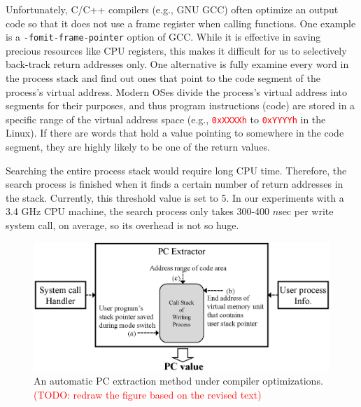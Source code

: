 Unfortunately, C/C++ compilers (e.g., GNU GCC) often optimize an output code so
that it does not use a frame register when calling functions.  One example is a
{\tt -fomit-frame-pointer} option of GCC. While it is effective in saving
precious resources like CPU registers, this makes it difficult for us to
selectively back-track return addresses only. One alternative is fully examine
every word in the process stack and find out ones that point to the code
segment of the process's virtual address.  Modern OSes divide the process's
virtual address into segments for their purposes, and thus program instructions
(code) are stored in a specific range of the virtual address space (e.g.,
\textcolor{red}{\texttt{0xXXXXh}} to \textcolor{red}{\texttt{0xYYYYh}} in the
Linux).  If there are words that hold a value pointing to somewhere in the code
segment, they are highly likely to be one of the return values.  

Searching the entire process stack would require long CPU time. Therefore, the
search process is finished when it finds a certain number of return addresses
in the stack. Currently, this threshold value is set to 5.  In our experiments
with a 3.4 GHz CPU machine, the search process only takes 300-400 $n$sec per
write system call, on average, so its overhead is not so huge.  

\begin{figure}[t]
	\centering
	\includegraphics[width=1\linewidth]{figure/getpc}
	\vspace{-10pt}
	\caption{An automatic PC extraction method under compiler optimizations.
	\textcolor{red}{(TODO: redraw the figure based on the revised text)}
	}
	\label{fig:getpc}
	\vspace{-15pt}
\end{figure}


